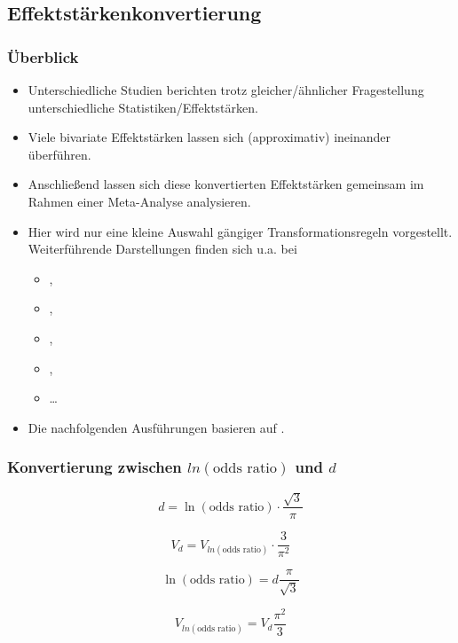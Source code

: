 \subsection{Effektstärkenkonvertierung}

\begin{frame}
  \frametitle{Überblick}
  
  \begin{itemize}
  \item Unterschiedliche Studien berichten trotz gleicher/ähnlicher
    Fragestellung unterschiedliche Statistiken/Effektstärken.
  \item Viele bivariate Effektstärken lassen sich (approximativ) ineinander
    überführen.
  \item Anschließend lassen sich diese konvertierten Effektstärken gemeinsam im
    Rahmen einer Meta-Analyse analysieren.
  \item Hier wird nur eine kleine Auswahl gängiger Transformationsregeln
    vorgestellt. Weiterführende Darstellungen finden sich u.a. bei
    \begin{itemize}
    \item \citet{borenstein_introduction_2009},
    \item \citet{rosenthal_contrasts_2000},
    \item \citet{lipsey_practical_2001},
    \item \citet{higgins_cochrane_2008},
      \item \ldots
    \end{itemize}
  \item Die nachfolgenden Ausführungen basieren auf \citet[46ff.]{borenstein_introduction_2009}.
  \end{itemize}
\end{frame}


\begin{frame}
  \frametitle{Konvertierung zwischen $ln(\text{odds ratio})$ und $d$}

  \begin{equation}
    d = \ln(\text{odds ratio}) \cdot \frac{\sqrt{3}}{\pi}
  \end{equation}
  
  \begin{equation}
    V_d = V_{ln(\text{odds ratio})} \cdot \frac{3}{\pi^2}
  \end{equation}
  
  \begin{equation}
    \ln(\text{odds ratio})=d\frac{\pi}{\sqrt{3}}
  \end{equation}

    \begin{equation}
    V_{ln(\text{odds ratio})} = V_d \frac{\pi^2}{3}
  \end{equation}  

\citep[46ff]{borenstein_introduction_2009}
      
\end{frame}


